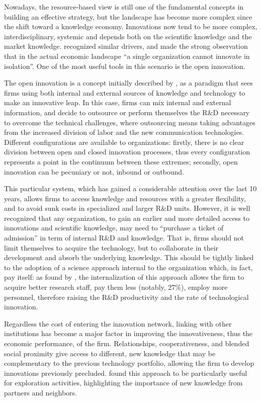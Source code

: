 Nowadays, the resource-based view is still one of the fundamental concepts in building an effective strategy, but the landscape has become more complex since the shift toward a knowledge economy. Innovations now tend to be more complex, interdisciplinary, systemic and depends both on the scientific knowledge and the market knowledge. \citet{Dahlander2010} recognized similar drivers, and made the strong observation that in the actual economic landscape \enquote{a single organization cannot innovate in isolation}. One of the most useful tools in this scenario is the open innovation.

The open innovation is a concept initially described by \citet{Chesbrough2003}, as a paradigm that sees firms using both internal and external sources of knowledge and technology to make an innovative leap. In this case, firms can mix internal and external information, and decide to outsource or perform themselves the R\&D necessary to overcome the technical challenges, where outsourcing  means taking advantages from the increased division of labor and the new communication technologies. Different configurations are available to organizations: firstly, there is no clear division between open and closed innovation processes, thus every configuration represents a point in the continuum between these extremes; secondly, open innovation can be pecuniary or not, inbound or outbound. 

This particular system, which has gained a considerable attention over the last 10 years, allows firms to access knowledge and resources with a greater flexibility, and to avoid sunk costs in specialized and larger R\&D units. However, it is well recognized that any organization, to gain an earlier and more detailed access to innovations and scientific knowledge, may need to \enquote{purchase a ticket of admission} in term of internal R\&D and knowledge. That is, firms should not limit themselves to acquire the technology, but to collaborate in their development and absorb the underlying knowledge. This should be tightly linked to the adoption of a science approach internal to the organization which, in fact, pay itself: as found by \citet{Stern2004}, the internalization of this approach allows the firm to acquire better research staff, pay them less (notably, 27\%), employ more personnel, therefore raising the R\&D productivity and the rate of technological innovation. 

Regardless the cost of entering the innovation network, linking with other institutions has become a major factor in improving the innovativeness, thus the economic performance, of the firm. Relationships, cooperativeness, and blended social proximity give access to different, new knowledge that may be complementary to the previous technology portfolio, allowing the firm to develop innovations previously precluded. \citet{Bercovitz2006} found this approach to be particularly useful for exploration activities, highlighting the importance of new knowledge from partners and neighbors.

